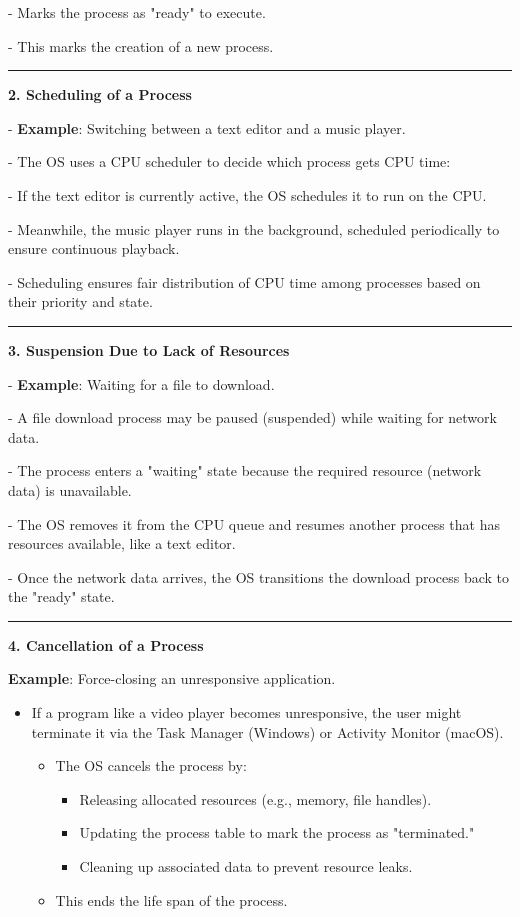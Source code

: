 \documentclass[a4paper]{book}
\begin{document}
       - Marks the process as "ready" to execute.
     
     - This marks the creation of a new process.
     
\rule{0.75\textwidth}{0.5pt}


\textbf{2. Scheduling of a Process}

   - \textbf{Example}: Switching between a text editor and a music player.
     
     - The OS uses a CPU scheduler to decide which process gets CPU time:
       
       - If the text editor is currently active, the OS schedules it to run on the CPU.
       
       - Meanwhile, the music player runs in the background, scheduled periodically to ensure continuous playback.
     
     - Scheduling ensures fair distribution of CPU time among processes based on their priority and state.

\rule{0.75\textwidth}{0.5pt}

\textbf{3. Suspension Due to Lack of Resources}

   - \textbf{Example}: Waiting for a file to download.
     
     - A file download process may be paused (suspended) while waiting for network data.
       
       - The process enters a "waiting" state because the required resource (network data) is unavailable.
       
       - The OS removes it from the CPU queue and resumes another process that has resources available, like a text editor.
     
     - Once the network data arrives, the OS transitions the download process back to the "ready" state.

\rule{0.75\textwidth}{0.5pt}

\textbf{4. Cancellation of a Process}

\textbf{Example}: Force-closing an unresponsive application.

\begin{itemize}
\item 
If a program like a video player becomes unresponsive, the user might terminate it via the Task Manager (Windows) or Activity Monitor (macOS).
\begin{itemize}
\item The OS cancels the process by:

\begin{itemize}
\item
Releasing allocated resources (e.g., memory, file handles).
\item
Updating the process table to mark the process as "terminated."
\item
Cleaning up associated data to prevent resource leaks.
\end{itemize}
\item
This ends the life span of the process.

\end{itemize}
\end{itemize}
\end{document}
